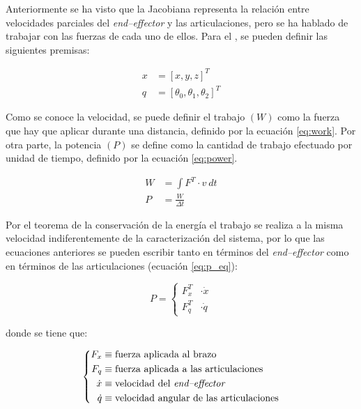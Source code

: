Anteriormente se ha visto que la Jacobiana representa la relación entre velocidades
parciales del \textit{end--effector} y las articulaciones, pero se ha hablado de trabajar
con las fuerzas de cada uno de ellos. Para el \pArm{}, se pueden definir las siguientes
premisas:

\begin{align*}
    x & = \left[x, y, z\right]^T                      \\
    q & = \left[\theta_0, \theta_1, \theta_2\right]^T
\end{align*}

Como se conoce la velocidad, se puede definir el trabajo $\left(W\right)$ como la fuerza
que hay que aplicar durante una distancia, definido por la ecuación \ref{eq:work}. Por
otra parte, la potencia $\left(P\right)$ se define como la cantidad de trabajo efectuado
por unidad de tiempo\cite{PotenciaFisica2020}, definido por la ecuación \ref{eq:power}.

\begin{align}
    W & = \int{F^T \cdot v~dt} \label{eq:work}   \\[1ex]
    P & = \frac{W}{\varDelta t} \label{eq:power}
\end{align}

Por el teorema de la conservación de la energía el trabajo se realiza a la misma
velocidad indiferentemente de la caracterización del sistema, por lo que las ecuaciones
anteriores se pueden escribir tanto en términos del \textit{end--effector}
como en términos de las articulaciones (ecuación \ref{eq:p_eq}):

\begin{equation}\label{eq:p_eq}
    P = \left\{\begin{aligned}
        F^T_x & \cdot \dot{x} \\
        F^T_q & \cdot \dot{q}
    \end{aligned}\right.
\end{equation}

donde se tiene que:

\begin{equation*}
    \left\{\begin{aligned}
        F_x     & \equiv \text{fuerza aplicada al brazo}                \\
        F_q     & \equiv \text{fuerza aplicada a las articulaciones}    \\
        \dot{x} & \equiv \text{velocidad del \textit{end--effector}}    \\
        \dot{q} & \equiv \text{velocidad angular de las articulaciones}
    \end{aligned}\right.
\end{equation*}

